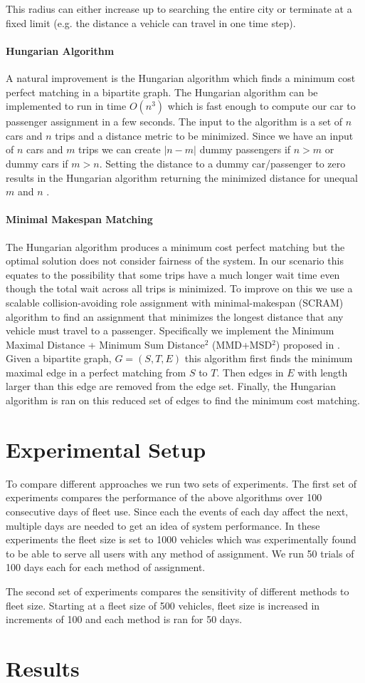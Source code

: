 \documentclass[letterpaper]{article}
\begin{document}
This radius can either increase up to searching the entire city or terminate at a fixed limit (e.g. the distance a vehicle can travel in one time step).

\paragraph{Hungarian Algorithm}
A natural improvement is the Hungarian algorithm \cite{kuhn1955hungarian} which finds a minimum cost perfect matching in a bipartite graph. The Hungarian algorithm can be implemented to run in time $O(n^3)$ which is fast enough to compute our car to passenger assignment in a few seconds. The input to the algorithm is a set of $n$ cars and $n$ trips and a distance metric to be minimized. Since we have an input of $n$ cars and $m$ trips we can create $|n-m|$ dummy passengers if $n > m$ or dummy cars if $m > n$. Setting the distance to a dummy car/passenger to zero results in the Hungarian algorithm returning the minimized distance for unequal $m$ and $n$ \cite{macalpine2015scram}.

\paragraph{Minimal Makespan Matching}
The Hungarian algorithm produces a minimum cost perfect matching but the optimal solution does not consider fairness of the system. In our scenario this equates to the possibility that some trips have a much longer wait time even though the total wait across all trips is minimized. To improve on this we use a scalable collision-avoiding role assignment with minimal-makespan (SCRAM) algorithm to find an assignment that minimizes the longest distance that any vehicle must travel to a passenger. Specifically we implement the Minimum Maximal Distance + Minimum Sum Distance$^2$ (MMD+MSD$^2$) proposed in \cite{macalpine2015scram}. Given a bipartite graph, $G = ({S,T},E)$  this algorithm first finds the minimum maximal edge in a perfect matching from $S$ to $T$. Then edges in $E$ with length larger than this edge are removed from the edge set. Finally, the Hungarian algorithm is ran on this reduced set of edges to find the minimum cost matching.  

\section{Experimental Setup}
To compare different approaches we run two sets of experiments. The first set of experiments compares the performance of the above algorithms over 100 consecutive days of fleet use. Since each the events of each day affect the next, multiple days are needed to get an idea of system performance. In these experiments the fleet size is set to 1000 vehicles which was experimentally found to be able to serve all users with any method of assignment. We run 50 trials of 100 days each for each method of assignment.

The second set of experiments compares the sensitivity of different methods to fleet size. Starting at a fleet size of 500 vehicles, fleet size is increased in increments of 100 and each method is ran for 50 days.

\section{Results}




\end{document}
